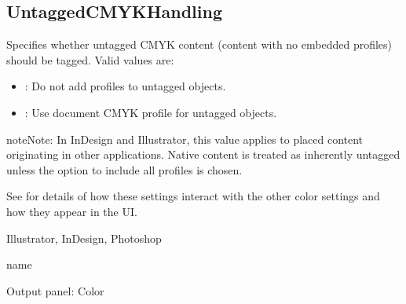 \documentclass[letterpaper,12pt,english,openany,oneside]{sphinxmanual}
\begin{document}
\label{\detokenize{PDF_Create_NewNamespaces:default-value-22}}

\begin{sphinxVerbatim}[commandchars=\\\{\}]
\end{sphinxVerbatim}




\subsection{UntaggedCMYKHandling}
\label{\detokenize{PDF_Create_NewNamespaces:untaggedcmykhandling}}
Specifies whether untagged CMYK content (content with no embedded profiles) should be tagged. Valid values are:
\begin{itemize}
\item {} 
 : Do not add profiles to untagged objects.

\item {} 
 : Use document CMYK profile for untagged objects.

\end{itemize}

\begin{sphinxadmonition}{note}{Note:}
In InDesign and Illustrator, this value applies to placed content originating in other applications. Native content is treated as inherently untagged unless the option to include all profiles is chosen.
\end{sphinxadmonition}

See  for details of how these settings interact with the other color settings and how they appear in the UI.

\label{\detokenize{PDF_Create_NewNamespaces:supported-by-24}}

Illustrator, InDesign, Photoshop

\label{\detokenize{PDF_Create_NewNamespaces:type-24}}

name

\label{\detokenize{PDF_Create_NewNamespaces:ui-name-24}}

Output panel: Color

\label{\detokenize{PDF_Create_NewNamespaces:default-value-23}}
\end{document}
